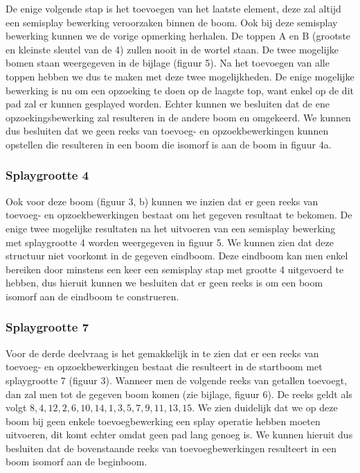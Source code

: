 \documentclass[dutch, 11pt]{report}
\begin{document}
De enige volgende stap is het toevoegen van het laatste element, deze zal altijd een semisplay bewerking veroorzaken binnen de boom. Ook bij deze semisplay bewerking kunnen we de vorige opmerking herhalen. De toppen A en B (grootste en kleinste sleutel van de 4) zullen nooit in de wortel staan. De twee mogelijke bomen staan weergegeven in de bijlage (figuur 5). Na het toevoegen van alle toppen hebben we dus te maken met deze twee mogelijkheden. De enige mogelijke bewerking is nu om een opzoeking te doen op de laagste top, want enkel op de dit pad zal er kunnen gesplayed worden. Echter kunnen we besluiten dat de ene opzoekingsbewerking zal resulteren in de andere boom en omgekeerd. 
We kunnen dus besluiten dat we geen reeks van toevoeg- en opzoekbewerkingen kunnen opstellen die resulteren in een boom die isomorf is aan de boom in figuur 4a.

\subsubsection*{Splaygrootte 4}
Ook voor deze boom (figuur 3, b) kunnen we inzien dat er geen reeks van toevoeg- en opzoekbewerkingen bestaat om het gegeven resultaat te bekomen. De enige twee mogelijke resultaten na het uitvoeren van een semisplay bewerking met splaygrootte 4 worden weergegeven in figuur 5. We kunnen zien dat deze structuur niet voorkomt in de gegeven eindboom. Deze eindboom kan men enkel bereiken door minstens een keer een semisplay stap met grootte 4 uitgevoerd te hebben, dus hieruit kunnen we besluiten dat er geen reeks is om een boom isomorf aan de eindboom te construeren.
\subsubsection*{Splaygrootte 7}
Voor de derde deelvraag is het gemakkelijk in te zien dat er een reeks van toevoeg- en opzoekbewerkingen bestaat die resulteert in de startboom met splaygrootte 7 (figuur 3). \newline
Wanneer men de volgende reeks van getallen toevoegt, dan zal men tot de gegeven boom komen (zie bijlage, figuur 6).
De reeks geldt als volgt $8, 4, 12, 2, 6, 10, 14, 1 , 3, 5, 7, 9, 11, 13, 15$. We zien duidelijk dat we op deze boom bij geen enkele toevoegbewerking een splay operatie hebben moeten uitvoeren, dit komt echter omdat geen pad lang genoeg is.\newline
We kunnen hieruit dus besluiten dat de bovenstaande reeks van toevoegbewerkingen resulteert in een boom isomorf aan de beginboom.
\end{document}
